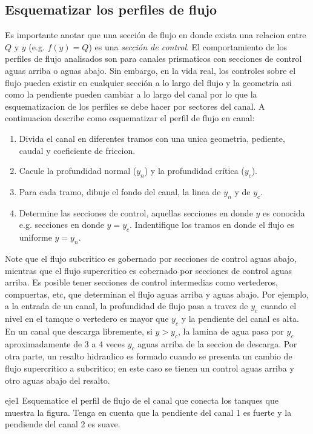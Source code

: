 \documentclass[11pt, oneside]{article}
\begin{document}
\subsection{Esquematizar los perfiles de flujo}
Es importante anotar que una secci\'on de flujo en donde exista una relacion entre $Q$ y $y$ (e.g. $f(y)=Q$) es una \emph{secci\'on de control}. El comportamiento de los perfiles de flujo analisados son para canales prismaticos con secciones de control aguas arriba o aguas abajo. Sin embargo, en la vida real, los controles sobre el flujo pueden existir en cualquier secci\'on a lo largo del flujo y la geometria asi como la pendiente pueden cambiar a lo largo del canal por lo que la esquematizacion de los perfiles se debe hacer por sectores del canal. A continuacion describe como esquematizar el perfil de flujo en canal:
\begin{enumerate}
    \item Divida el canal en diferentes tramos con una unica geometria, pediente, caudal y coeficiente de friccion.
    \item Cacule la profundidad normal ($y_n$) y la profundidad cr\'itica ($y_c$).
    \item Para cada tramo, dibuje el fondo del canal, la linea de $y_n$ y de $y_c$.
    \item Determine las secciones de control, aquellas secciones en donde $y$ es conocida e.g. secciones en donde $y = y_c$. Indentifique los tramos en donde el flujo es uniforme $y = y_n$.
\end{enumerate}
Note que el flujo subcritico es gobernado por  secciones de control aguas abajo, mientras que el flujo supercritico es cobernado por secciones de control aguas arriba. Es posible tener secciones de control intermedias como vertederos, compuertas, etc, que determinan el flujo aguas arriba y aguas abajo. Por ejemplo, a la entrada de un canal, la profundidad de flujo pasa a travez de $y_c$ cuando el nivel en el tamque o vertedero es mayor que $y_c$ y la pendiente del canal es alta. En un canal que descarga libremente, si $y > y_c$, la lamina de agua pasa por $y_c$ aproximadamente de 3 a 4 veces $y_c$ aguas arriba de la seccion de descarga. Por otra parte, un resalto hidraulico es formado cuando se presenta un cambio de flujo supercritico a subcritico; en este caso se tienen un control aguas arriba y otro aguas abajo del resalto.

\begin{eje}{}{eje1}
Esquematice el perfil de flujo de el  canal que conecta los tanques que muestra la figura. Tenga en cuenta que la pendiente del canal 1 es fuerte y la pendiende del canal 2 es suave.
\end{eje}





\end{document}
